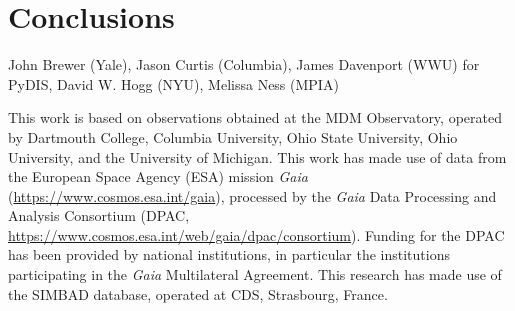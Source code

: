 \documentclass[modern, letterpaper]{aastex61}
\begin{document}
\section{Conclusions }

\acknowledgements
John Brewer (Yale),
Jason Curtis (Columbia),
James Davenport (WWU) for PyDIS,
David W. Hogg (NYU),
Melissa Ness (MPIA)

This work is based on observations obtained at the MDM Observatory, operated by
Dartmouth College, Columbia University, Ohio State University, Ohio University,
and the University of Michigan.
This work has made use of data from the European Space Agency (ESA)
mission {\it Gaia} (\url{https://www.cosmos.esa.int/gaia}), processed by
the {\it Gaia} Data Processing and Analysis Consortium (DPAC,
\url{https://www.cosmos.esa.int/web/gaia/dpac/consortium}). Funding
for the DPAC has been provided by national institutions, in particular
the institutions participating in the {\it Gaia} Multilateral Agreement.
This research has made use of the SIMBAD database, operated at CDS, Strasbourg,
France.





\end{document}
